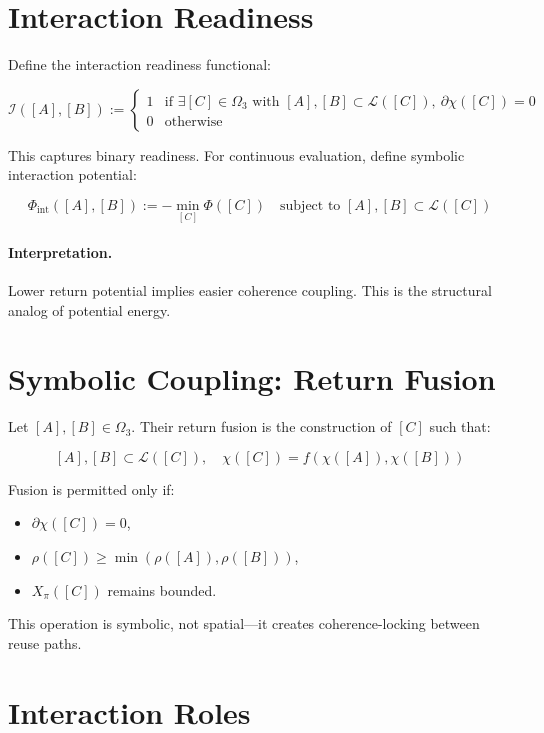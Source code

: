 \section{Interaction Readiness} \label{sec:interaction-readiness}

Define the interaction readiness functional:

\[
\mathcal{I}([A], [B]) := 
\begin{cases}
1 & \text{if } \exists [C] \in \Omega_3 \text{ with } [A], [B] \subset \mathcal{L}([C]),\ \partial\chi([C]) = 0 \\
0 & \text{otherwise}
\end{cases}
\]

This captures binary readiness. For continuous evaluation, define symbolic interaction potential:

\[
\Phi_{\text{int}}([A], [B]) := -\min_{[C]} \Phi([C]) \quad \text{subject to } [A], [B] \subset \mathcal{L}([C])
\]

\paragraph{Interpretation.}
Lower return potential implies easier coherence coupling. This is the structural analog of potential energy.

\section{Symbolic Coupling: Return Fusion} \label{sec:return-fusion}

Let $[A], [B] \in \Omega_3$. Their return fusion is the construction of $[C]$ such that:

\[
[A], [B] \subset \mathcal{L}([C]),\quad \chi([C]) = f(\chi([A]), \chi([B]))
\]

Fusion is permitted only if:

\begin{itemize}
  \item $\partial\chi([C]) = 0$,
  \item $\rho([C]) \geq \min(\rho([A]), \rho([B]))$,
  \item $X_\pi([C])$ remains bounded.
\end{itemize}

This operation is symbolic, not spatial—it creates coherence-locking between reuse paths.

\section{Interaction Roles} \label{sec:interaction-roles}

